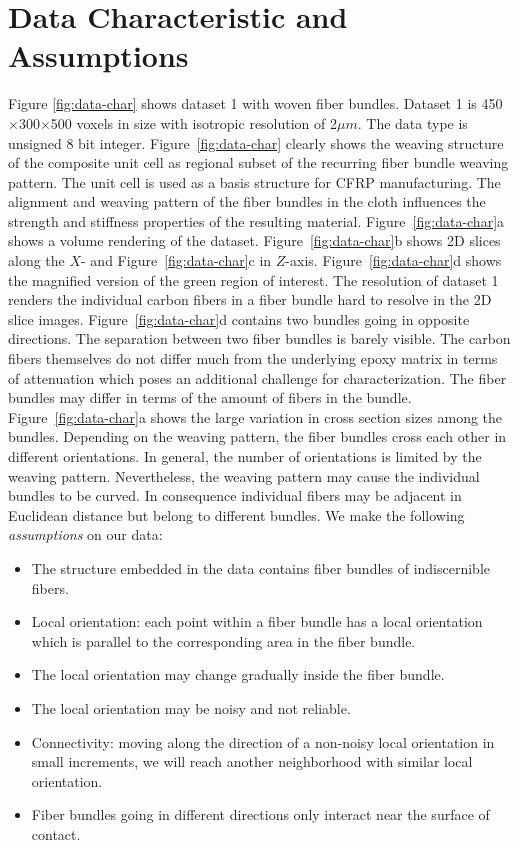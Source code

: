 \section {Data Characteristic and Assumptions}
\label{sec:char_data}
Figure \ref{fig:data-char} shows dataset 1 with woven fiber bundles. Dataset 1 is 450$\times$300$\times$500 voxels in size with isotropic resolution of 2$\mu m$. The data type is unsigned 8 bit integer. Figure~\ref{fig:data-char} clearly shows the weaving structure of the composite unit cell as regional subset of the recurring fiber bundle weaving pattern. The unit cell is used as a basis structure for CFRP manufacturing. The alignment and weaving pattern of the fiber bundles in the cloth influences the strength and stiffness properties of the resulting material. Figure~\ref{fig:data-char}a shows a volume rendering of the dataset. Figure~\ref{fig:data-char}b shows 2D slices along the $X$- and Figure~\ref{fig:data-char}c in $Z$-axis. Figure~\ref{fig:data-char}d shows the magnified version of the green region of interest. 
The resolution of dataset 1 renders the individual carbon fibers in a fiber bundle hard to resolve in the 2D slice images. Figure~\ref{fig:data-char}d contains two bundles going in opposite directions. The separation between two fiber bundles is barely visible. The carbon fibers themselves do not differ much from the underlying epoxy matrix in terms of attenuation which poses an additional challenge for characterization. The fiber bundles may differ in terms of the amount of fibers in the bundle. Figure~\ref{fig:data-char}a shows the large variation in cross section sizes among the bundles.
Depending on the weaving pattern, the fiber bundles cross each other in different orientations. In general, the number of orientations is limited by the weaving pattern. Nevertheless, the weaving pattern may cause the individual bundles to be curved. In consequence individual fibers may be adjacent in Euclidean distance but belong to different bundles. 
We make the following \textit{assumptions} on our data:
\begin{itemize}[noitemsep]
\item The structure embedded in the data contains fiber bundles of indiscernible fibers.
\item Local orientation: each point within a fiber bundle has a local orientation which is parallel to the corresponding area in the fiber bundle.
\item The local orientation may change gradually inside the fiber bundle.
\item The local orientation may be noisy and not reliable.
\item Connectivity: moving along the direction of a non-noisy local orientation in small increments, we will reach another neighborhood with similar local orientation.
\item Fiber bundles going in different directions only interact near the surface of contact.
\end{itemize}
